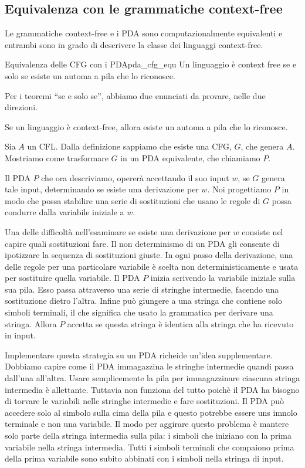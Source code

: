 \documentclass[12pt]{report}
\newcounter{theorem}
\newcounter{lemma}
\newcommand{\nmu}{}
\begin{document}
\subsection{Equivalenza con le grammatiche context-free}
Le grammatiche context-free e i PDA sono computazionalmente equivalenti e entrambi sono in grado di descrivere la classe dei linguaggi context-free.
\begin{theorem}{\nmu Equivalenza delle CFG con i PDA}{pda_cfg_equ}
	Un linguaggio è context free se e solo se esiste un automa a pila che lo riconosce.
\end{theorem}
Per i teoremi ``se e solo se'', abbiamo due enunciati da provare, nelle due direzioni.
\begin{lemma}{}{}
Se un linguaggio è context-free, allora esiste un automa a pila che lo riconosce.
\end{lemma}
Sia $A$ un CFL. Dalla definizione sappiamo che esiste una CFG, $G$, che genera $A$. Mostriamo come trasformare $G$  in un PDA equivalente, che chiamiamo $P$.

Il PDA $P$ che ora descriviamo, opererà accettando il suo input $w$, se $G$ genera tale input, determinando se esiste una derivazione per $w$. Noi progettiamo $P$ in modo che possa stabilire una serie di sostituzioni che usano le regole di $G$ possa condurre dalla variabile iniziale a $w$.

Una delle difficoltà nell'esaminare se esiste una derivazione per $w$ consiste nel capire quali sostituzioni fare. Il non determinismo di un PDA gli consente di ipotizzare la sequenza di sostituzioni giuste. In ogni passo della derivazione, una delle regole per una particolare variabile è scelta non deterministicamente e usata per sostituire quella variabile. Il PDA $P$ inizia scrivendo la variabile iniziale sulla sua pila. Esso passa attraverso una serie di stringhe intermedie, facendo una sostituzione dietro l'altra. Infine può giungere a una stringa che contiene solo simboli terminali, il che significa che usato la grammatica per derivare una stringa. Allora $P$ accetta se questa stringa è identica alla stringa che ha ricevuto in input.

Implementare questa strategia su un PDA richeide un'idea supplementare. Dobbiamo capire come il PDA immagazzina le stringhe intermedie quandi passa dall'una all'altra. Usare semplicemente la pila per immagazzinare ciascuna stringa intermedia è allettante. Tuttavia non funziona del tutto poichè il PDA ha bisogno di torvare le variabili nelle stringhe intermedie e fare sostituzioni. Il PDA può accedere solo al simbolo sulla cima della pila e questo potrebbe essere uns imnolo terminale e non una variabile. Il modo per aggirare questo problema è mantere solo parte della stringa intermedia sulla pila: i simboli che iniziano con la prima variabile nella stringa intermedia.  Tutti i simboli terminali che compaiono prima della prima variabile sono subito abbinati con i simboli nella stringa di input.
\end{document}
